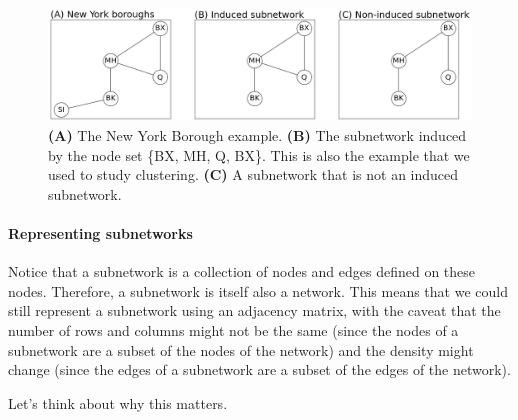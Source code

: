 \begin{figure}[h]
    \centering
    \includegraphics[width=\linewidth]{representations/ch4/Images/subnet.png}
    \caption[New York boroughs example]{\textbf{(A)} The New York Borough example. \textbf{(B)} The subnetwork induced by the node set \{BX, MH, Q, BX\}. This is also the example that we used to study clustering. \textbf{(C)} A subnetwork that is not an induced subnetwork.}
    \label{fig:ch4:subnet}
\end{figure}

\paragraph*{Representing subnetworks}
Notice that a subnetwork is a collection of nodes and edges defined on these nodes. Therefore, a subnetwork is itself also a network. This means that we could still represent a subnetwork using an adjacency matrix, with the caveat that the number of rows and columns might not be the same (since the nodes of a subnetwork are a subset of the nodes of the network) and the density might change (since the edges of a subnetwork are a subset of the edges of the network).

Let's think about why this matters.

